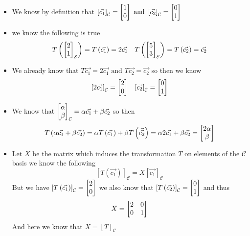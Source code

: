 \documentclass[11pt]{book}
\begin{document}
\begin{itemize}
    \item We know by definition that $\left[ \vec{c_1}  \right]_{\mathcal{C}} =  \begin{bmatrix} 1 \\ 0 \end{bmatrix} \text{ and } \left[ \vec{c_2}  \right]_{\mathcal{C}} =  \begin{bmatrix} 0 \\ 1 \end{bmatrix} $ 
    \item we know the following is true
        \begin{align*}
            T\left(\begin{bmatrix} 2 \\ 1 \end{bmatrix} _{\mathcal{E} } \right)=  T\left(\vec{c_1} \right)=  2\vec{c_1}  && T\left(\begin{bmatrix} 5 \\ 3 \end{bmatrix} _{\mathcal{E} } \right)=  T\left(\vec{c_2} \right)=  \vec{c_2} 
        \end{align*}
    \item We already know that $T\vec{c_1} =  2\vec{c_1} \text{ and } T\vec{c_2} =  \vec{c_2}  $ so then we know
        \begin{align*}
            \left[ 2\vec{c_1}  \right]_{\mathcal{C}} =  \begin{bmatrix} 2 \\ 0 \end{bmatrix}  && \left[ \vec{c_2}  \right]_{\mathcal{C}} =  \begin{bmatrix} 0 \\ 1 \end{bmatrix} 
        \end{align*}
    \item We know that $\begin{bmatrix} \alpha  \\ \beta  \end{bmatrix} _{\mathcal{C} } =  \alpha \vec{c_1}  + \beta \vec{c_2} $ so then
        \begin{equation*}
            T\left(\alpha \vec{c_1}  + \beta \vec{c_2} \right)=  \alpha T\left(\vec{c_1} \right) + \beta T\left(\vec{\vec{c_2} } \right)=  \alpha 2\vec{c_1}  + \beta \vec{c_2} =  \begin{bmatrix} 2\alpha  \\ \beta  \end{bmatrix}   
        \end{equation*}
    \item Let $X$ be the matrix which induces the transformation $T$ on elements of the $\mathcal{C} $ basis we know the following
        \[
        \left[ T\left(\vec{c_1} \right) \right]_{\mathcal{C}} =  X\left[ \vec{c_1}  \right]_{\mathcal{C}} 
        \]
        But we have $\left[ T\left(\vec{c_1} \right) \right]_{\mathcal{C}} =  \begin{bmatrix} 2 \\ 0 \end{bmatrix} $ we also know that $\left[ T\left(\vec{c_2} \right) \right]_{\mathcal{C}} =  \begin{bmatrix} 0 \\ 1 \end{bmatrix} $ and thus 
        \[
        X=  \begin{bmatrix} 2 & 0 \\ 0 & 1 \end{bmatrix}
        \]
        And here we know that $X =  \left[ T \right]_{\mathcal{C}} $ 

\end{itemize}
\end{document}
